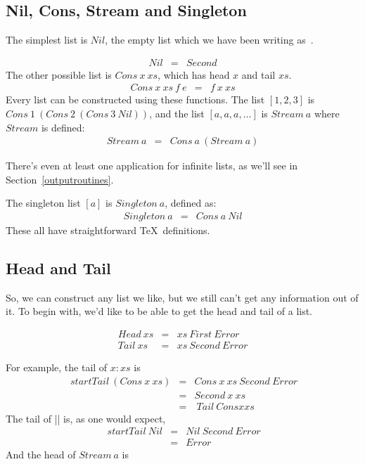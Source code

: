 \subsection{Nil, Cons, Stream and Singleton}

The simplest list is $Nil$, the empty list which we have been writing
as~\nil.  

\begin{eqnarray*}
   Nil  &  =  &  Second
\end{eqnarray*}
The other possible list is $Cons~x~xs$, which has head $x$ and tail $xs$.
\begin{eqnarray*}
   Cons~x~xs~f~e  &  =  &  f~x~xs
\end{eqnarray*}
Every list can be constructed using these functions.
The list $[1,2,3]$ is $Cons~1~(Cons~2~(Cons~3~Nil))$, and the
list $[a,a,a,\ldots]$ is $Stream~a$ where $Stream$ is defined:
\begin{eqnarray*}
   Stream~a  &  =  &  Cons~a~(Stream~a)
\end{eqnarray*}

There's even at least one application for infinite lists,
as we'll see in Section~\ref{outputroutines}.

The singleton list $[a]$ is $Singleton~a$, defined as:
\begin{eqnarray*}
   Singleton~a  &  =  &  Cons~a~Nil
\end{eqnarray*}
These all have straightforward \TeX\ definitions.

\begin{teX}
\let\Nil=\Second
\def\Cons#1#2#3#4{#3{#1}{#2}}
\def\Stream#1{\Cons{#1}{\Stream{#1}}}
\def\Singleton#1{\Cons{#1}\Nil}
\end{teX}




\subsection{Head and Tail}

So, we can construct any list we like, but we still can't get any information
out of it.  To begin with, we'd like to be able to get the head
and tail of a list.

\begin{eqnarray*}
   Head~xs  &  =  &  xs~First~Error  \\
   Tail~xs  &  =  &  xs~Second~Error
\end{eqnarray*}

For example, the tail of $x:xs$ is
\begin{eqnarray*}
   \ start{Tail~(Cons~x~xs)}  
   &  =  &  Cons~x~xs~Second~Error  \\
   &  =  &  Second~x~xs  \\
   &  =  &  \ Tail{\ Cons{x}{xs}}
\end{eqnarray*}
The tail of |\nil| is, as one would expect,
\begin{eqnarray*}
   \ start{Tail~Nil}  
   &  =  &  Nil~Second~Error  \\
   &  =  &  Error
\end{eqnarray*}
And the head of $Stream~a$ is


